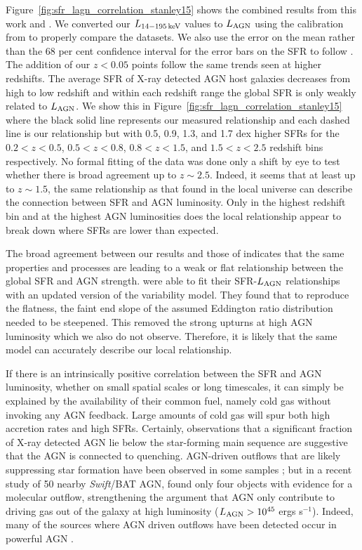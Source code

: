\documentclass[fleqn, usenatbib]{mnras}
\newcommand{\swift}{\textit{Swift}}
\begin{document}
Figure~\ref{fig:sfr_lagn_correlation_stanley15} shows the combined results from this work and \citet{Stanley:2015qy}. We converted our $L_{\rm 14-195\,keV}$ values to $L_{\rm AGN}$ using the calibration from \citet{Winter:2012yq} to properly compare the datasets. We also use the error on the mean rather than the 68 per cent confidence interval for the error bars on the SFR to follow \citet{Stanley:2015qy}. The addition of our $z<0.05$ points follow the same trends seen at higher redshifts. The average SFR of X-ray detected AGN host galaxies decreases from high to low redshift and within each redshift range the global SFR is only weakly related to $L_{\rm AGN}$. We show this in Figure~\ref{fig:sfr_lagn_correlation_stanley15} where the black solid line represents our measured relationship and each dashed line is our relationship but with 0.5, 0.9, 1.3, and 1.7 dex higher SFRs for the $0.2<z<0.5$, $0.5<z<0.8$, $0.8<z<1.5$, and $1.5<z<2.5$ redshift bins respectively. No formal fitting of the data was done only a shift by eye to test whether there is broad agreement up to $z\sim2.5$. Indeed, it seems that at least up to $z\sim1.5$, the same relationship as that found in the local universe can describe the connection between SFR and AGN luminosity. Only in the highest redshift bin and at the highest AGN luminosities does the local relationship appear to break down where SFRs are lower than expected.

The broad agreement between our results and those of \citet{Stanley:2015qy} indicates that the same properties and processes are leading to a weak or flat relationship between the global SFR and AGN strength. \citet{Stanley:2015qy} were able to fit their SFR-$L_{\rm AGN}$ relationships with an updated version of the \citet{Hickox:2014yq} variability model. They found that to reproduce the flatness, the faint end slope of the assumed Eddington ratio distribution needed to be steepened. This removed the strong upturns at high AGN luminosity which we also do not observe. Therefore, it is likely that the same model can accurately describe our local relationship.
 
If there is an intrinsically positive correlation between the SFR and AGN luminosity, whether on small spatial scales or long timescales, it can simply be explained by the availability of their common fuel, namely cold gas without invoking any AGN feedback. Large amounts of cold gas will spur both high accretion rates and high SFRs. Certainly, observations that a significant fraction of X-ray detected AGN lie below the star-forming main sequence \citep{Shimizu:2015xo, Matsuoka:2015fk, Mullaney:2015wn} are suggestive that the AGN is connected to quenching. AGN-driven outflows that are likely suppressing star formation have been observed in some samples \citep{Veilleux:2013qq, Cicone:2014ty, Genzel:2014rm, Tombesi:2015fj}; but in a recent study of 50 nearby \swift/BAT AGN, \citet{Stone:2016zl} found only four objects with evidence for a molecular outflow, strengthening the argument that AGN only contribute to driving gas out of the galaxy at high luminosity ($L_{\rm AGN} > 10^{45}$ ergs s$^{-1}$). Indeed, many of the sources where AGN driven outflows have been detected occur in powerful AGN \citep[e.g.][]{Cano-Diaz:2012en,Brusa:2015qk,Cresci:2015tk,Perna:2015rd}. 
\end{document}
